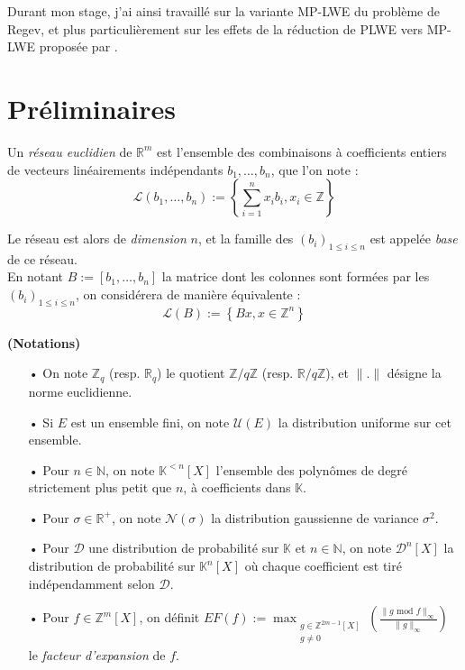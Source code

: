 \documentclass[11pt,a4paper]{article}
\begin{document}
Durant mon stage, j'ai ainsi travaillé sur la variante MP-LWE du problème de Regev, et plus particulièrement sur les effets de la réduction de PLWE vers MP-LWE proposée par \cite{mplwe}.
\\

\section{Préliminaires}
\begin{defin} 
Un \textit{réseau euclidien} de $\mathbb{R}^m$ est l'ensemble des combinaisons à coefficients entiers de vecteurs linéairements indépendants $b_1, \dots, b_n$, que l'on note :
\[\mathcal{L}(b_1,\dots,b_n) := \left\{ \sum_{i=1}^n x_ib_i, x_i \in \mathbb{Z} \right\} \]

Le réseau est alors de \textit{dimension} $n$, et la famille des $(b_i)_{1\leq i \leq n}$ est appelée \textit{base} de ce réseau. \\

En notant $B:=[b_1,\dots,b_n]$ la matrice dont les colonnes sont formées par les $(b_i)_{1\leq i \leq n}$, on considérera de manière équivalente : \[\mathcal{L}(B) := \left\{ Bx, x \in \mathbb{Z}^n \right\} \]
\end{defin}

\begin{defin}\textbf{(Notations)}
\begin{itemize}
\item[•] On note $\mathbb{Z}_q$ (resp. $\mathbb{R}_q$) le quotient $\mathbb{Z}/q\mathbb{Z}$ (resp. $\mathbb{R}/q\mathbb{Z}$), et $\|.\|$ désigne la norme euclidienne.
\item[•] Si $E$ est un ensemble fini, on note $\mathcal{U}(E)$ la distribution uniforme sur cet ensemble.
\item[•] Pour $n\in \mathbb{N}$, on note $\mathbb{K}^{<n}[X]$ l'ensemble des polynômes de degré strictement plus petit que $n$, à coefficients dans $\mathbb{K}$.
\item[•] Pour $\sigma \in \mathbb{R}^+$, on note $\mathcal{N}(\sigma)$ la distribution gaussienne de variance $\sigma^2$.
\item[•] Pour $\mathcal{D}$ une distribution de probabilité sur $\mathbb{K}$ et $n\in \mathbb{N}$, on note $\mathcal{D}^n[X]$ la distribution de probabilité sur $\mathbb{K}^n[X]$ où chaque coefficient est tiré indépendamment selon $\mathcal{D}$.
\item[•] Pour $f \in \mathbb{Z}^m[X]$, on définit $EF(f) :=\displaystyle \max_{\substack{g\in \mathbb{Z}^{2m-1}[X] \\ g \neq 0}}(\frac{\|g\text{ mod }f \|_\infty}{\|g\|_\infty})$ le \textit{facteur d'expansion} de $f$.
\end{itemize}
\end{defin}
\end{document}
